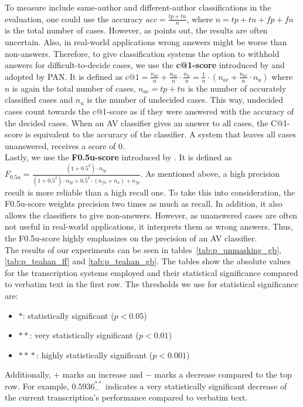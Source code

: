 To measure include same-author and different-author classifications in the evaluation, one could use the accuracy $acc = \frac{tp+tn}{n}$, where $n = tp+tn+fp+fn$ is the total number of cases.
However, as \cite{bevendorff2019unmaskingShortTexts} points out, the results are often uncertain.
Also, in real-world applications wrong answers might be worse than non-answers.
Therefore, to give classification systems the option to withhold answers for difficult-to-decide cases, we use the \textbf{c@1-score} introduced by \cite{penas2011c_at_1} and adopted by PAN.
It is defined as $c@1 = \frac{n_{ac}}{n}+\frac{n_{ac}}{n}\cdot{}\frac{n_u}{n} = \frac{1}{n}\cdot{}\left(n_{ac}+\frac{n_{ac}}{n}\cdot{}n_u\right)$ where $n$ is again the total number of cases, $n_{ac} = tp+tn$ is the number of accurately classified cases and $n_u$ is the number of undecided cases.
This way, undecided cases count towards the c@1-score as if they were answered with the accuracy of the decided cases.
When an AV classifier gives an answer to all cases, the C@1-score is equivalent to the accuracy of the classifier.
A system that leaves all cases unanswered, receives a score of 0.\\
Lastly, we use the \textbf{F0.5u-score} introduced by \cite{bevendorff2019unmaskingShortTexts}.
It is defined as $F_{0.5u} = \frac{(1+0.5^2)\cdot{}n_{tp}}{(1+0.5^2)\cdot{}n_{tp}+0.5^2\cdot{}(n_{fn}+n_u)+n_{fp}}$.
As mentioned above, a high precision result is more reliable than a high recall one.
To take this into consideration, the F0.5u-score weights precision two times as much as recall.
In addition, it also allows the classifiers to give non-answers.
However, as unanswered cases are often not useful in real-world applications, it interprets them as wrong answers.
Thus, the F0.5u-score highly emphasizes on the precision of an AV classifier.\\



The results of our experiments can be seen in tables~\ref{tab:p_unmasking_gb}, \ref{tab:p_teahan_ff} and \ref{tab:p_teahan_gb}.
The tables show the absolute values for the transcription systems employed and their statistical significance compared to verbatim text in the first row.
The thresholds we use for statistical significance are:
\begin{itemize}
    \item $*$: statistically significant ($p < 0.05$)
    \item $*\! *$: very statistically significant ($p < 0.01$)
    \item $*\! *\! *$: highly statistically significant ($p < 0.001$)
\end{itemize}
Additionally, $+$ marks an increase and $-$ marks a decrease compared to the top row.
For example, $0.5936^{*\! *}_{-}$ indicates a very statistically significant decrease of the current transcription's performance compared to verbatim text.

